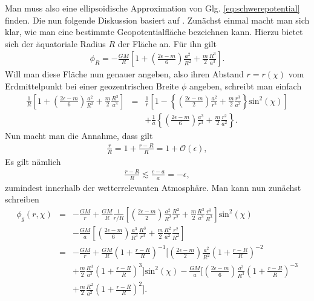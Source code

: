 \documentclass{book}
\renewcommand{\sin}{\text{sin}}
\begin{document}
Man muss also eine ellipsoidische Approximation von Glg. \eqref{eq:schwerepotential} finden. Die nun folgende Diskussion basiert auf \cite{staniforth}. Zunächst einmal macht man sich klar, wie man eine bestimmte Geopotentialfläche bezeichnen kann. Hierzu bietet sich der äquatoriale Radius $R$ der Fläche an. Für ihn gilt
%
\begin{eqnarray}
\phi_R = -\frac{GM}{R}\left[1 + \left(\frac{2\epsilon - m}{6}\right)\frac{a^2}{R^2} + \frac{m}{2}\frac{R^3}{a^3}\right].
\end{eqnarray}
%
Will man diese Fläche nun genauer angeben, also ihren Abstand $r = r\left(\chi\right)$ vom Erdmittelpunkt bei einer geozentrischen Breite $\phi$ angeben, schreibt man einfach
%
\begin{eqnarray}
\frac{1}{R}\left[1 + \left(\frac{2\epsilon - m}{6}\right)\frac{a^2}{R^2} + \frac{m}{2}\frac{R^3}{a^3}\right] & = & \frac{1}{r}\left[1 - \left\{\left(\frac{2\epsilon - m}{2}\right)\frac{a^2}{r^2} + \frac{m}{2}\frac{r^3}{a^3}\right\}\sin^2\left(\chi\right)\right]\nonumber\\
&&+ \frac{1}{a}\left\{\left(\frac{2\epsilon - m}{6}\right)\frac{a^3}{r^3} + \frac{m}{2}\frac{r^2}{a^2}\right\}.
\end{eqnarray}
%
Nun macht man die Annahme, dass gilt
%
\begin{eqnarray}
\frac{r}{R} = 1 + \frac{r - R}{R} = 1 + \mathcal{O}\left(\epsilon\right), 
\end{eqnarray}
%
Es gilt nämlich
%
\begin{eqnarray}
\frac{r - R}{R} \lesssim \frac{c - a}{a} = -\epsilon, 
\end{eqnarray}
%
zumindest innerhalb der wetterrelevanten Atmosphäre. Man kann nun zunächst schreiben
%
\begin{eqnarray}
\phi_g\left(r, \chi\right) & = & -\frac{GM}{r} + \frac{GM}{R}\frac{1}{r/R}\left[\left(\frac{2\epsilon - m}{2}\right)\frac{a^2}{R^2}\frac{R^2}{r^2} + \frac{m}{2}\frac{R^3}{a^3}\frac{r^3}{R^3}\right]\sin^2\left(\chi\right)\nonumber\\
&&- \frac{GM}{a}\left[\left(\frac{2\epsilon - m}{6}\right)\frac{a^3}{R^3}\frac{R^3}{r^3} + \frac{m}{2}\frac{R^2}{a^2}\frac{r^2}{R^2}\right]\nonumber\\
& = & -\frac{GM}{r} + \frac{GM}{R}\left(1 + \frac{r - R}{R}\right)^{-1}\bigg[\left(\frac{2\epsilon - m}{2}\right)\frac{a^2}{R^2}\left(1 + \frac{r - R}{R}\right)^{-2}\nonumber\\
&&+ \frac{m}{2}\frac{R^3}{a^3}\left(1 + \frac{r - R}{R}\right)^{3}\bigg]\sin^2\left(\chi\right) - \frac{GM}{a}\bigg[\left(\frac{2\epsilon - m}{6}\right)\frac{a^3}{R^3}\left(1 + \frac{r - R}{R}\right)^{-3}\nonumber\\
&&+ \frac{m}{2}\frac{R^2}{a^2}\left(1 + \frac{r - R}{R}\right)^{2}\bigg].\label{eq:schwere_approx_1}
\end{eqnarray}
\end{document}
